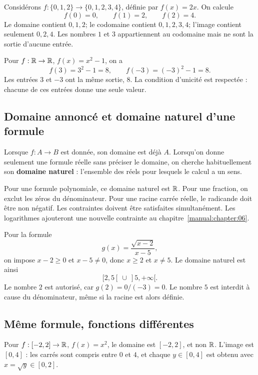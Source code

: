 \begin{examplebox}[title={Trois ensembles, trois rôles}]
Considérons \(f:\{0,1,2\}\to\{0,1,2,3,4\}\), définie par \(f(x)=2x\). On calcule
\[
f(0)=0,\qquad f(1)=2,\qquad f(2)=4.
\]
Le domaine contient \(0,1,2\); le codomaine contient \(0,1,2,3,4\); l'image contient seulement \(0,2,4\). Les nombres \(1\) et \(3\) appartiennent au codomaine mais ne sont la sortie d'aucune entrée.
\end{examplebox}

Pour \(f:\mathbb{R}\to\mathbb{R}\), \(f(x)=x^2-1\), on a
\[
f(3)=3^2-1=8,\qquad f(-3)=(-3)^2-1=8.
\]
Les entrées $3$ et $-3$ ont la même sortie, $8$. La condition d'unicité est respectée : chacune de ces entrées donne une seule valeur.

\subsection*{Domaine annoncé et domaine naturel d'une formule}
Lorsque \(f:A\to B\) est donnée, son domaine est déjà \(A\). Lorsqu'on donne seulement une formule réelle sans préciser le domaine, on cherche habituellement son \textbf{domaine naturel} : l'ensemble des réels pour lesquels le calcul a un sens.

Pour une formule polynomiale, ce domaine naturel est \(\mathbb{R}\). Pour une fraction, on exclut les zéros du dénominateur. Pour une racine carrée réelle, le radicande doit être non négatif. Les contraintes doivent être satisfaites simultanément. Les logarithmes ajouteront une nouvelle contrainte au chapitre~\ref{manual:chapter:06}.

\begin{examplebox}[title={Croiser les contraintes}]
Pour la formule
\[
g(x)=\frac{\sqrt{x-2}}{x-5},
\]
on impose \(x-2\ge0\) et \(x-5\ne0\), donc \(x\ge2\) et \(x\ne5\). Le domaine naturel est ainsi
\[
[2,5[\ \cup\ ]5,+\infty[.
\]
Le nombre \(2\) est autorisé, car \(g(2)=0/(-3)=0\). Le nombre \(5\) est interdit à cause du dénominateur, même si la racine est alors définie.
\end{examplebox}

\subsection*{Même formule, fonctions différentes}
Pour \(f:[-2,2]\to\mathbb{R}\), \(f(x)=x^2\), le domaine est \([-2,2]\), et non \(\mathbb{R}\). L'image est \([0,4]\) : les carrés sont compris entre \(0\) et \(4\), et chaque \(y\in[0,4]\) est obtenu avec \(x=\sqrt y\in[0,2]\).

